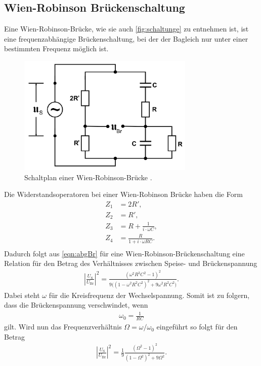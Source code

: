 \subsection{Wien-Robinson Brückenschaltung}
Eine Wien-Robinson-Brücke, wie sie auch \autoref{fig:schaltunge} zu entnehmen ist, ist eine frequenzabhängige 
Brückenschaltung, bei der der Bagleich nur unter einer bestimmten Frequenz möglich ist.
\begin{figure}[H]
    \centering
    \includegraphics[width=0.75\textwidth]{dateien/aufgabee).png}
    \caption{Schaltplan einer Wien-Robinson-Brücke \cite{anleitung}.}
    \label{fig:schaltunge}
\end{figure}

\sloppy
Die Widerstandsoperatoren bei einer Wien-Robinson Brücke haben die Form
\begin{align*}
    Z_1 &= 2R', \\
    Z_2 &= R' , \\
    Z_3 &= R + \frac{1}{i\cdot\omega C} , \\
    Z_4 &= \frac{R}{1+i\cdot\omega RC} . \\
\end{align*}
Dadurch folgt aus \autoref{eqn:abgBr} für eine Wien-Robinson-Brückenschaltung eine Relation für den Betrag des Verhältnisses
zwischen Speise- und Brückenspannung
\begin{align*}
    |\frac{U_{\text{S}}}{U_{\text{Br}}}|^2 = \frac{(\omega^2 R^2C^2-1)^2}{9\Big((1-\omega^2R^2C^2)^2 + 9\omega^2R^2C^2\Big)}.
\end{align*}
Dabei steht $\omega$ für die Kreisfrequenz der Wechselspannung.
Somit ist zu folgern, dass die Brückenspannung verschwindet, wenn 
\begin{align*}
    \omega_0 = \frac{1}{RC}
\end{align*}
gilt. Wird nun das Frequenzverhältnis $\Omega = \omega/\omega_0$ eingeführt so folgt für den Betrag
\begin{align}
    |\frac{U_{\text{S}}}{U_{\text{Br}}}|^2 = \frac 19 \frac{(\Omega^2-1)^2}{(1-\Omega^2)^2+9\Omega^2}.
    \label{eqn:wienRGl}
\end{align}

